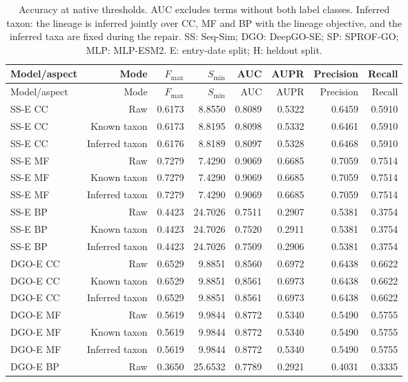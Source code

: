 \begingroup\scriptsize
\setlength{\tabcolsep}{4pt}
\begin{longtable}{lrrrrrrr}
\caption{Accuracy at native thresholds. AUC excludes terms without both label classes. Inferred taxon: the lineage is inferred jointly over CC, MF and BP with the lineage objective, and the inferred taxa are fixed during the repair. SS: Seq-Sim; DGO: DeepGO-SE; SP: SPROF-GO; MLP: MLP-ESM2. E: entry-date split; H: heldout split.}\label{tab:supp-accuracy}\\
\toprule
Model/aspect & Mode & $F_{\max}$ & $S_{\min}$ & AUC & AUPR & Precision & Recall \\
\midrule
\endfirsthead
\toprule
Model/aspect & Mode & $F_{\max}$ & $S_{\min}$ & AUC & AUPR & Precision & Recall \\
\midrule
\endhead
SS-E CC & Raw & 0.6173 & 8.8550 & 0.8089 & 0.5322 & 0.6459 & 0.5910 \\
SS-E CC & Known taxon & 0.6173 & 8.8195 & 0.8098 & 0.5332 & 0.6461 & 0.5910 \\
SS-E CC & Inferred taxon & 0.6176 & 8.8189 & 0.8097 & 0.5328 & 0.6468 & 0.5910 \\
SS-E MF & Raw & 0.7279 & 7.4290 & 0.9069 & 0.6685 & 0.7059 & 0.7514 \\
SS-E MF & Known taxon & 0.7279 & 7.4290 & 0.9069 & 0.6685 & 0.7059 & 0.7514 \\
SS-E MF & Inferred taxon & 0.7279 & 7.4290 & 0.9069 & 0.6685 & 0.7059 & 0.7514 \\
SS-E BP & Raw & 0.4423 & 24.7026 & 0.7511 & 0.2907 & 0.5381 & 0.3754 \\
SS-E BP & Known taxon & 0.4423 & 24.7026 & 0.7520 & 0.2911 & 0.5381 & 0.3754 \\
SS-E BP & Inferred taxon & 0.4423 & 24.7026 & 0.7509 & 0.2906 & 0.5381 & 0.3754 \\
DGO-E CC & Raw & 0.6529 & 9.8851 & 0.8560 & 0.6972 & 0.6438 & 0.6622 \\
DGO-E CC & Known taxon & 0.6529 & 9.8851 & 0.8561 & 0.6973 & 0.6438 & 0.6622 \\
DGO-E CC & Inferred taxon & 0.6529 & 9.8851 & 0.8561 & 0.6973 & 0.6438 & 0.6622 \\
DGO-E MF & Raw & 0.5619 & 9.9844 & 0.8772 & 0.5340 & 0.5490 & 0.5755 \\
DGO-E MF & Known taxon & 0.5619 & 9.9844 & 0.8772 & 0.5340 & 0.5490 & 0.5755 \\
DGO-E MF & Inferred taxon & 0.5619 & 9.9844 & 0.8772 & 0.5340 & 0.5490 & 0.5755 \\
DGO-E BP & Raw & 0.3650 & 25.6532 & 0.7789 & 0.2921 & 0.4031 & 0.3335 \\

\end{longtable}
